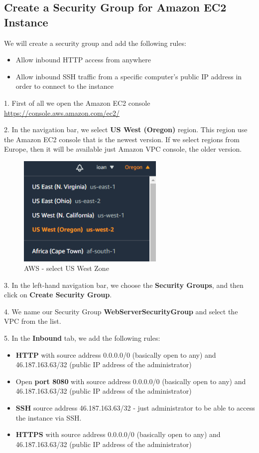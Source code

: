 \documentclass[12pt,a4paper,twoside]{article}
\begin{document}
\subsection{Create a Security Group for Amazon EC2 Instance}

We will create a security group and add the following rules:
\begin{itemize}
	\item Allow inbound HTTP access from anywhere
	\item Allow inbound SSH traffic from a specific computer's public IP address in order to connect to the instance
\end{itemize}


1. First of all we open the Amazon EC2 console \url{ https://console.aws.amazon.com/ec2/} 


2. In the navigation bar, we select \textbf{US West (Oregon)} region. This region use the Amazon EC2 console that is the newest version. If we select regions from Europe, then it will be available just Amazon VPC console, the older version.


\begin{figure}[H]
    \centering
        \includegraphics[width=7cm]{images-aws/1-aws-zone.png}
        \caption{AWS - select US West Zone}
\end{figure}


3. In the left-hand navigation bar, we choose the \textbf{Security Groups}, and then click on \textbf{Create Security Group}.


4. We name our Security Group \textbf{WebServerSecurityGroup} and select the VPC from the list.


5. In the \textbf{Inbound} tab, we add the following rules:
\begin{itemize}
	\item \textbf{HTTP} with source address 0.0.0.0/0 (basically open to any) and 46.187.163.63/32 (public IP address of the administrator)
	\item Open \textbf{port 8080} with source address 0.0.0.0/0 (basically open to any) and 46.187.163.63/32 (public IP address of the administrator)
	\item \textbf{SSH}   source address 46.187.163.63/32 - just administrator to be able to access the instance via SSH.
	\item \textbf{HTTPS} with source address 0.0.0.0/0 (basically open to any) and 46.187.163.63/32 (public IP address of the administrator)
\end{itemize}
\end{document}
